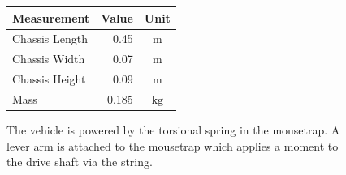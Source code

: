 \documentclass[a4paper]{article}
\begin{document}
\begin{figure}[h]
	\centering
	\begin{minipage}{0.45\textwidth}
		\centering
		\caption{The vehicle is powered by the torsional spring in the mousetrap. A lever arm is attached to the mousetrap which applies a moment to the drive shaft via the string.}
	\end{minipage}
	\hspace{1cm}
	\begin{minipage}{0.45\textwidth}
		\centering
		\begin{tabular}{p{3cm}rc}
			\toprule
			Measurement & Value & Unit \\
			\midrule
			Chassis Length & 0.45 & $\si{\meter}$ \\
			Chassis Width & 0.07 & $\si{\meter}$ \\
			Chassis Height & 0.09 & $\si{\meter}$ \\
			Mass & 0.185 & $\si{\kilogram}$ \\
			\bottomrule
		\end{tabular}
	\end{minipage}	
\end{figure}
\end{document}
